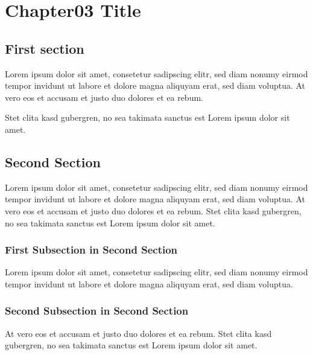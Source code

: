 \chapter{Chapter03 Title}

\section{First section}
Lorem ipsum dolor sit amet, consetetur sadipscing elitr, sed diam nonumy eirmod tempor invidunt ut labore et dolore magna aliquyam erat, sed diam voluptua. 
At vero eos et accusam et justo duo dolores et ea rebum. 

Stet clita kasd gubergren, no sea takimata sanctus est Lorem ipsum dolor sit amet. 
\section{Second Section}
Lorem ipsum dolor sit amet, consetetur sadipscing elitr, sed diam nonumy eirmod tempor invidunt ut labore et dolore magna aliquyam erat, sed diam voluptua. 
At vero eos et accusam et justo duo dolores et ea rebum. Stet clita kasd gubergren, no sea takimata sanctus est Lorem ipsum dolor sit amet. 

\subsection{First Subsection in Second Section}
Lorem ipsum dolor sit amet, consetetur sadipscing elitr, sed diam nonumy eirmod tempor invidunt ut labore et dolore magna aliquyam erat, sed diam voluptua. 

\subsection{Second Subsection in Second Section}
At vero eos et accusam et justo duo dolores et ea rebum. 
Stet clita kasd gubergren, no sea takimata sanctus est Lorem ipsum dolor sit amet.   